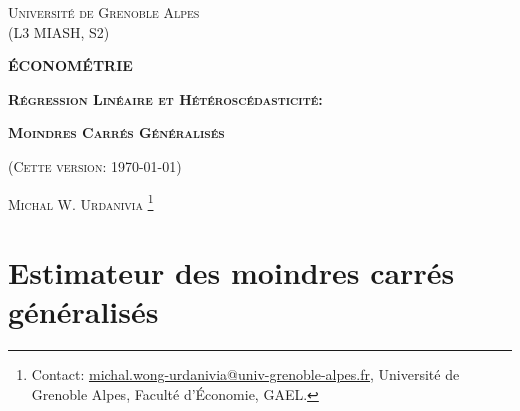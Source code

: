 \documentclass[10pt, reqno]{amsart}
\begin{document}
 
\usetikzlibrary{positioning}
\usetikzlibrary{snakes}
\usetikzlibrary{calc}
\usetikzlibrary{arrows}
\usetikzlibrary{decorations.markings}
\usetikzlibrary{shapes.misc}
\usetikzlibrary{shapes}

%


\begin{titlepage}
\centering
	{\scshape\Large \textsc{Université de Grenoble Alpes\\(L3 MIASH, S2)}\par}
	\vspace{0.5cm}
	{\Large\bfseries \scshape\Large \textsc{ÉCONOMÉTRIE}\par}
	\vspace{0.5cm}
	{\Large\bfseries \textsc{Régression Linéaire et Hétéroscédasticité:
    } \par}
    \vspace{1cm}   
	{\Large\bfseries \textsc{Moindres Carrés Généralisés} \par}
	\vspace{1cm}
	{(\textsc{Cette version: \today})\par}
	\vspace{1cm}
	{\large \textsc{Michal W. Urdanivia}
	\footnote{Contact:  
	\href{mailto:michal.wong-urdanivia@univ-grenoble-alpes.fr}{michal.wong-urdanivia@univ-grenoble-alpes.fr}, 
	 Université de Grenoble Alpes,  Faculté d'\'Economie, GAEL.}\par}
	
\end{titlepage}


\newpage

\tableofcontents

\newpage

\newpage

\tableofcontents

\newpage

\section{Estimateur des moindres carrés généralisés}
\end{document}
